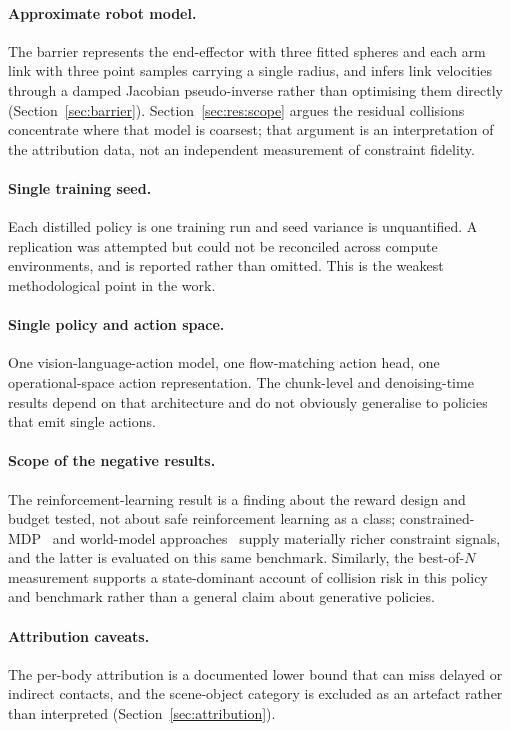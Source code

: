 \paragraph{Approximate robot model.}
The barrier represents the end-effector with three fitted spheres and each arm link with three
point samples carrying a single radius, and infers link velocities through a damped Jacobian
pseudo-inverse rather than optimising them directly (Section~\ref{sec:barrier}).
Section~\ref{sec:res:scope} argues the residual collisions concentrate where that model is
coarsest; that argument is an interpretation of the attribution data, not an independent
measurement of constraint fidelity.

\paragraph{Single training seed.}
Each distilled policy is one training run and seed variance is unquantified. A replication was
attempted but could not be reconciled across compute environments, and is reported rather than
omitted. This is the weakest methodological point in the work.

\paragraph{Single policy and action space.}
One vision-language-action model, one flow-matching action head, one operational-space action
representation. The chunk-level and denoising-time results depend on that architecture and do not
obviously generalise to policies that emit single actions.

\paragraph{Scope of the negative results.}
The reinforcement-learning result is a finding about the reward design and budget tested, not about
safe reinforcement learning as a class; constrained-MDP~\cite{safevla} and world-model
approaches~\cite{safedojo} supply materially richer constraint signals, and the latter is evaluated
on this same benchmark. Similarly, the best-of-$N$ measurement supports a state-dominant account of
collision risk in this policy and benchmark rather than a general claim about generative policies.

\paragraph{Attribution caveats.}
The per-body attribution is a documented lower bound that can miss delayed or indirect contacts,
and the scene-object category is excluded as an artefact rather than interpreted
(Section~\ref{sec:attribution}).

